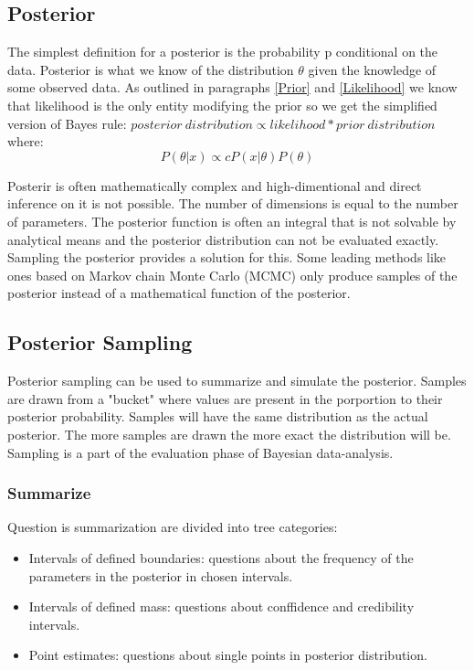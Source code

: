 \subsection{Posterior}\label{Posterior}
The simplest definition for a posterior is the probability p conditional on the data.\cite{Mcelreath2015StatisticalRA} Posterior is what we know of the distribution $\theta$ given the knowledge of some observed data.
As outlined in paragraphs \ref{Prior} and \ref{Likelihood} we know that likelihood is the only entity modifying the prior so we get the simplified version of Bayes rule: $posterior\ distribution \propto likelihood * prior\ distribution$ where: 
\begin{equation}\label{BayesRuleWithConstants}
P(\theta|x) \propto cP(x|\theta)P(\theta)
\end{equation}\cite{Box1973BayesianII}

Posterir is often mathematically complex and high-dimentional and direct inference on it is not possible. The number of dimensions is equal to the number of parameters. The posterior function is often an integral that is not solvable by analytical means and the posterior distribution can not be evaluated exactly. Sampling the posterior provides a solution for this.\cite{vandeSchoot2020BayesianSA}
Some leading methods like ones based on Markov chain Monte Carlo (MCMC) only produce samples of the posterior instead of a mathematical function of the posterior.\cite{Mcelreath2015StatisticalRA}

\subsection{Posterior Sampling}\label{PosteriorSampling}
Posterior sampling can be used to summarize and simulate the posterior. Samples are drawn from a "bucket" where values are present in the porportion to their posterior probability. Samples will have the same distribution as the actual posterior. The more samples are drawn the more exact the distribution will be. Sampling is a part of the evaluation phase of Bayesian data-analysis.
\subsubsection*{Summarize}
Question is summarization are divided into tree categories: 
\begin{itemize}
    \item Intervals of defined boundaries: questions about the frequency of the parameters in the posterior in chosen intervals.
    \item Intervals of defined mass: questions about conffidence and credibility intervals. 
    \item Point estimates: questions about single points in posterior distribution.
\end{itemize}
